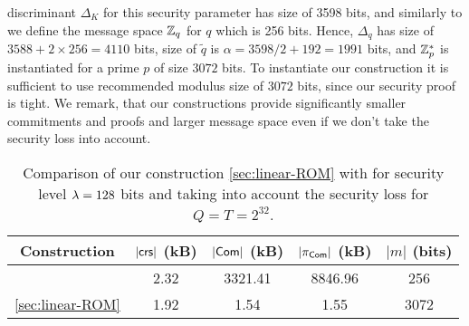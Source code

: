discriminant $\Delta_K$ for this security parameter has size of 3598 bits, and similarly to \cite{CCS:TCLM21} we define the message space $\mathbb{Z}_q$ for $q$ which is 256 bits. Hence, $\Delta_q$ has size of $3588+2\times 256 = 4110$ bits, size of $\tilde{q}$ is $\alpha = 3598/2 + 192 = 1991$ bits, and $\mathbb{Z}_p^*$ is instantiated for a prime $p$ of size $3072$ bits. To instantiate our construction it is sufficient to use recommended modulus size of $3072$ bits, since our security proof is tight. We remark, that our constructions provide significantly smaller commitments and proofs and larger message space even if we don't take the security loss into account.



\begin{table}[tb]
\begin{center}
\begin{tabular}{c|c|c|c|c}
\hline
\textbf{Construction}   & $|\mathsf{crs}|$ (kB)      &$|\mathsf{Com}|$ (kB) & $|\pi_{\mathsf{Com}}|$ (kB) & $|m|$ (bits)\\
\hline

\cite{CCS:TCLM21}    & 2.32   & 3321.41 &   8846.96
 & 256 \\
\hline

\ref{sec:linear-ROM}         & 1.92       & 1.54      & 1.55 & 3072 \\

\hline
\end{tabular}
\caption{\label{tab:comparison-NITC}Comparison of our construction \ref{sec:linear-ROM} with \cite{CCS:TCLM21} for security level $\lambda = 128$ bits and taking into account the security loss for $Q = T = 2^{32}$.}
\end{center}
\end{table}

